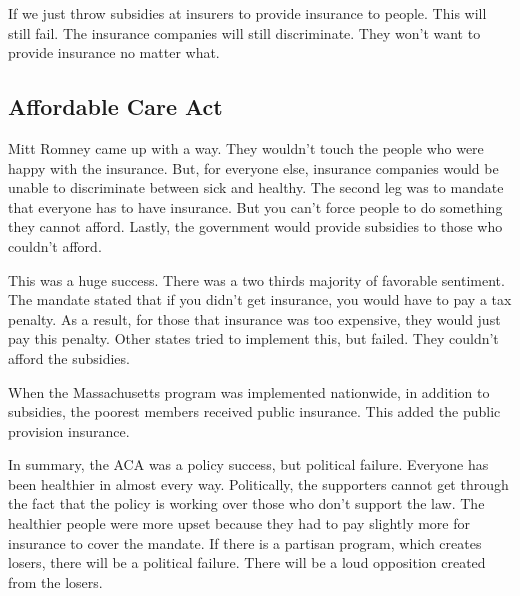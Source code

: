 \documentclass{article}
\begin{document}
If we just throw subsidies at insurers to provide insurance to people. This will
still fail. The insurance companies will still discriminate. They won't want to
provide insurance no matter what.

\subsection{Affordable Care Act}

Mitt Romney came up with a way. They wouldn't touch the people who were happy
with the insurance. But, for everyone else, insurance companies would be unable
to discriminate between sick and healthy. The second leg was to mandate that
everyone has to have insurance. But you can't force people to do something they
cannot afford. Lastly, the government would provide subsidies to those who
couldn't afford.

This was a huge success. There was a two thirds majority of favorable sentiment.
The mandate stated that if you didn't get insurance, you would have to pay a tax
penalty. As a result, for those that insurance was too expensive, they would
just pay this penalty. Other states tried to implement this, but failed. They
couldn't afford the subsidies.

When the Massachusetts program was implemented nationwide, in addition to
subsidies, the poorest members received public insurance. This added the public
provision insurance.

\bigbreak

In summary, the ACA was a policy success, but political failure. Everyone has
been healthier in almost every way. Politically, the supporters cannot get
through the fact that the policy is working over those who don't support the
law. The healthier people were more upset because they had to pay slightly more
for insurance to cover the mandate. If there is a partisan program, which
creates losers, there will be a political failure. There will be a loud
opposition created from the losers.
\end{document}
